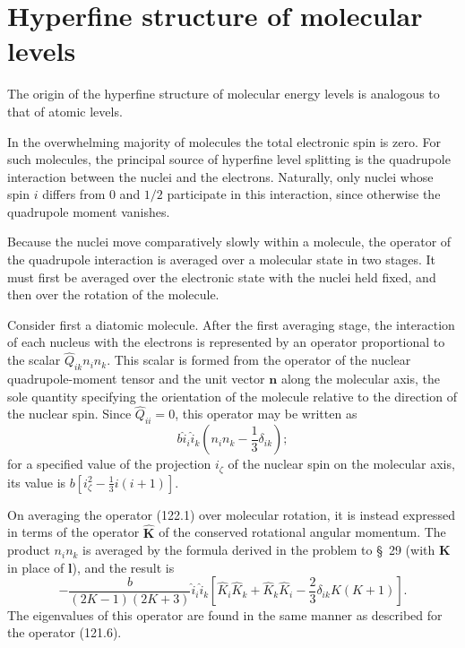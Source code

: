 \section{Hyperfine structure of molecular levels}

The origin of the hyperfine structure of molecular energy levels is analogous
to that of atomic levels.

In the overwhelming majority of molecules the total electronic spin is zero.
For such molecules, the principal source of hyperfine level splitting is the
quadrupole interaction between the nuclei and the electrons. Naturally, only
nuclei whose spin $i$ differs from 0 and $1/2$ participate in this
interaction, since otherwise the quadrupole moment vanishes.

Because the nuclei move comparatively slowly within a molecule, the operator
of the quadrupole interaction is averaged over a molecular state in two
stages. It must first be averaged over the electronic state with the nuclei
held fixed, and then over the rotation of the molecule.

Consider first a diatomic molecule. After the first averaging stage, the
interaction of each nucleus with the electrons is represented by an operator
proportional to the scalar $\hat Q_{ik}n_in_k$. This scalar is formed from the
operator of the nuclear quadrupole-moment tensor and the unit vector
$\mathbf n$ along the molecular axis, the sole quantity specifying the
orientation of the molecule relative to the direction of the nuclear spin.
Since $\hat Q_{ii}=0$, this operator may be written as
\begin{equation}
 b\hat i_i\hat i_k\left(n_in_k-\frac13\delta_{ik}\right);
 \tag{122.1}
\end{equation}
for a specified value of the projection $i_\zeta$ of the nuclear spin on the
molecular axis, its value is $b[i_\zeta^2-\frac13i(i+1)]$.

On averaging the operator (122.1) over molecular rotation, it is instead
expressed in terms of the operator $\hat{\mathbf K}$ of the conserved
rotational angular momentum. The product $n_in_k$ is averaged by the formula
derived in the problem to \S~29 (with $\mathbf K$ in place of $\mathbf l$),
and the result is
\begin{equation}
 -\frac{b}{(2K-1)(2K+3)}\hat i_i\hat i_k
 \left[\hat K_i\hat K_k+\hat K_k\hat K_i
 -\frac23\delta_{ik}K(K+1)\right].
 \tag{122.2}
\end{equation}
The eigenvalues of this operator are found in the same manner as described
for the operator (121.6).

